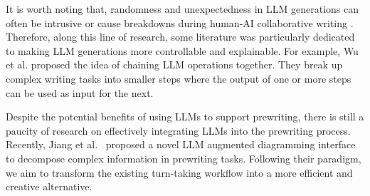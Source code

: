 It is worth noting that, randomness and unexpectedness in LLM generations can often be intrusive or cause breakdowns during human-AI collaborative writing \cite{clark2018creative}. Therefore, along this line of research, some literature was particularly dedicated to making LLM generations more controllable and explainable. For example, Wu et al. \cite{wu2022ai,wu2022promptchainer} proposed the idea of chaining LLM operations together. They break up complex writing tasks into smaller steps where the output of one or more steps can be used as input for the next.

Despite the potential benefits of using LLMs to support prewriting, there is still a paucity of research on effectively integrating LLMs into the prewriting process.
Recently, Jiang et al.~\cite{jiang2023graphologue} proposed a novel LLM augmented diagramming interface to decompose complex information in prewriting tasks.
Following their paradigm, we aim to transform the existing turn-taking workflow into a more efficient and creative alternative. 